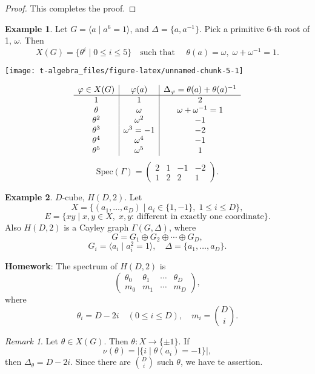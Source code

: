 \documentclass[
]{book}
\theoremstyle{definition}
\theoremstyle{definition}
\newtheorem{example}{Example}[chapter]
\theoremstyle{definition}
\theoremstyle{definition}
\theoremstyle{remark}
\newtheorem*{remark}{Remark}
\begin{document}
\begin{proof}
This completes the proof.

\end{proof}

\begin{example}
Let \(G = \langle a\mid a^6 = 1\rangle\), and \(\Delta = \{a, a^{-1}\}\). Pick a primitive 6-th root of 1, \(\omega\). Then
\[X(G) = \{\theta^i\mid 0\leq i\leq 5\} \quad \text{such that }\quad \theta(a) = \omega, \; \omega + \omega^{-1} = 1.\]

\begin{center}\texttt{[image: t-algebra\_files/figure-latex/unnamed-chunk-5-1]} \end{center}

\[\begin{array}{c | c | c}
\varphi\in X(G) & \varphi(a) & \Delta_\varphi = \theta(a) + \theta(a)^{-1}\\
\hline
1 & 1 & 2\\
\theta & \omega & \omega+\omega^{-1} = 1\\
\theta^2 & \omega^2 & -1\\
\theta^3 & \omega^3 = -1 & -2\\
\theta^4 & \omega^4 & -1\\
\theta^5 & \omega^5 & 1
\end{array}\]
\[\text{Spec}(\Gamma) = \begin{pmatrix} 2 & 1 & -1 & -2\\ 1 & 2 & 2 & 1\end{pmatrix}.\]
\end{example}

\begin{example}
\(D\)-cube, \(H(D,2)\). Let
\[X = \{(a_1, \ldots, a_D)\mid a_i\in \{1,-1\}, \; 1\leq i\leq D\},\]
\[E = \{xy\mid x, y\in X, \; x, y \text{: different in exactly one coordinate}\}.\]
Also \(H(D,2)\) is a Cayley graph \(\Gamma(G, \Delta)\), where
\[G = G_1\oplus G_2 \oplus \cdots \oplus G_D, \]
\[G_i = \langle a_i\mid a_i^2  = 1\rangle,\quad \Delta = \{a_1, \ldots, a_D\}.\]
\end{example}

\textbf{Homework}: The spectrum of \(H(D,2)\) is
\[\begin{pmatrix} \theta_0 & \theta_1 & \cdots & \theta_D\\
m_0 & m_1 & \cdots & m_D\end{pmatrix},\]
where
\[\theta_i = D-2i \quad (0\leq i\leq D), \quad m_i = \binom{D}{i}.\]

\begin{remark}
Let \(\theta \in X(G)\). Then \(\theta: X \to \{\pm 1\}\). If
\[\nu(\theta) = |\{i\mid \theta(a_i) = -1\}|, \]
then \(\Delta_\theta = D-2i\). Since there are \(\binom{D}{i}\) such \(\theta\), we have te assertion.
\end{remark}
\end{document}
